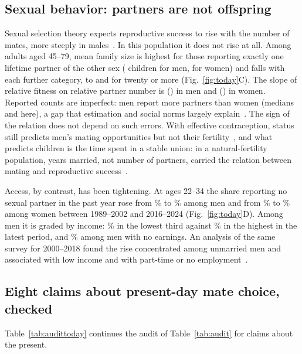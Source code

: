 \subsection{Sexual behavior: partners are not offspring}

Sexual selection theory expects reproductive success to rise with the number of mates, more steeply in
males~\cite{jones2009}. In this population it does not rise at all. Among adults aged 45--79, mean family size is highest
for those reporting exactly one lifetime partner of the other sex (\GssBatMOne{} children for men, \GssBatWOne{} for women) and
falls with each further category, to \GssBatMTwenty{} and \GssBatWTwenty{} for twenty or more (Fig.~\ref{fig:today}C). The slope of
relative fitness on relative partner number is \GssBatMGrad{} (\GssBatMGradCI) in men and \GssBatWGrad{} (\GssBatWGradCI) in women.
Reported counts are imperfect: men report more partners than women (medians \GssBatMMed{} and \GssBatWMed{} here), a gap that
estimation and social norms largely explain~\cite{mitchell2019}. The sign of the relation does not depend on such errors. With
effective contraception, status still predicts men's mating opportunities but not their fertility~\cite{perusse1993}, and what
predicts children is the time spent in a stable union: in a natural-fertility population, years married, not number of
partners, carried the relation between mating and reproductive success~\cite{borgerhoffmulder2019}.

Access, by contrast, has been tightening. At ages 22--34 the share reporting no sexual partner in the past year rose from
\GssPlMOld\% to \GssPlMNew\% among men and from \GssPlWOld\% to \GssPlWNew\% among women between 1989--2002 and 2016--2024
(Fig.~\ref{fig:today}D). Among men it is graded by income: \GssPlMLo\% in the lowest third against \GssPlMHi\% in the highest in the
latest period, and \GssPlMNone\% among men with no earnings. An analysis of the same survey for 2000--2018 found the rise
concentrated among unmarried men and associated with low income and with part-time or no employment~\cite{ueda2020}.

\subsection{Eight claims about present-day mate choice, checked}

Table~\ref{tab:audittoday} continues the audit of Table~\ref{tab:audit} for claims about the present.

